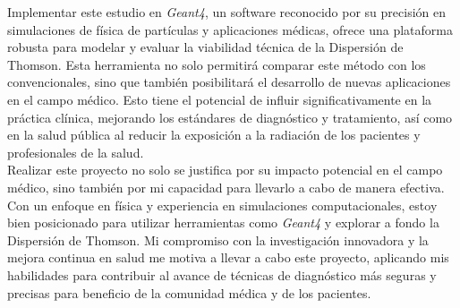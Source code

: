 Implementar este estudio en \textit{Geant4}, un software reconocido por su precisión en simulaciones de física de partículas y aplicaciones médicas, ofrece una plataforma robusta para modelar y evaluar la viabilidad técnica de la Dispersión de Thomson. Esta herramienta no solo permitirá comparar este método con los convencionales, sino que también posibilitará el desarrollo de nuevas aplicaciones en el campo médico. Esto tiene el potencial de influir significativamente en la práctica clínica, mejorando los estándares de diagnóstico y tratamiento, así como en la salud pública al reducir la exposición a la radiación de los pacientes y profesionales de la salud. \\

Realizar este proyecto no solo se justifica por su impacto potencial en el campo médico, sino también por mi capacidad para llevarlo a cabo de manera efectiva. Con un enfoque en física y experiencia en simulaciones computacionales, estoy bien posicionado para utilizar herramientas como \textit{Geant4} y explorar a fondo la Dispersión de Thomson. Mi compromiso con la investigación innovadora y la mejora continua en salud me motiva a llevar a cabo este proyecto, aplicando mis habilidades para contribuir al avance de técnicas de diagnóstico más seguras y precisas para beneficio de la comunidad médica y de los pacientes.



\vspace*{\fill}